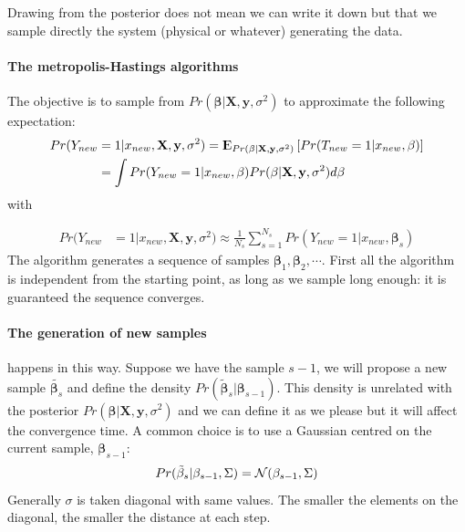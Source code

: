 \documentclass[12pt, letterpaper]{article}
\theoremstyle{definition}
\newcommand{\E}{{\rm I\kern-.3em E}}
\newcommand{\X}{\mathrm{\mathbf{X}}}
\newcommand{\y}{\mathbf{y}}
\newcommand{\be}{\mathbf{\beta}}
\begin{document}
Drawing from the posterior does not mean we can write it down but that we sample directly the system (physical or whatever) generating the data.

\paragraph{The metropolis-Hastings algorithms}
The objective is to sample from $Pr(\be|\X,\y,\sigma^2)$ to approximate the following expectation:
\begin{equation}
\begin{aligned}
Pr(Y_{new}&=1|x_{new},\X,\y,\sigma^2) = \E_{Pr(\be|\X,\y,\sigma^2)}\left[Pr(T_{new}=1|x_{new},\be) \right] \\
&=\int Pr(Y_{new}=1|x_{new},\be)Pr(\be|\X,\y,\sigma^2) d\be
\end{aligned}
\end{equation}
with 

\begin{equation}
\begin{aligned}
Pr(Y_{new}&=1|x_{new},\X,\y,\sigma^2) \approx \frac{1}{N_s}\sum_{s=1}^{N_s} Pr(Y_{new}=1|x_{new}, \be_s)
\end{aligned}
\end{equation}
The algorithm generates a sequence of samples $\be_1, \be_2, \cdots$. First all the algorithm is independent from the starting point, as long as we sample long enough: it is guaranteed the sequence converges.
\paragraph{\textbf{The generation of new samples}} happens in this way. Suppose we have the sample $s-1$, we will propose a new sample $\tilde{\be_s}$ and define the density $Pr(\tilde{\be}_s|\be_{s-1})$. This density is unrelated with the posterior $Pr(\be|\X,\y,\sigma^2)$ and we can define it as we please but it will affect the convergence time. A common choice is to use a Gaussian centred on the current sample, $\be_{s-1}$:
\begin{equation}
Pr(\tilde{\be}_s|\be_{s-1}, \Sigma) =\CMcal{N}(\be_{s-1}, \Sigma)
\end{equation}
Generally $\sigma$ is taken diagonal with same values. The smaller the elements on the diagonal, the smaller the distance at each step.
\end{document}
